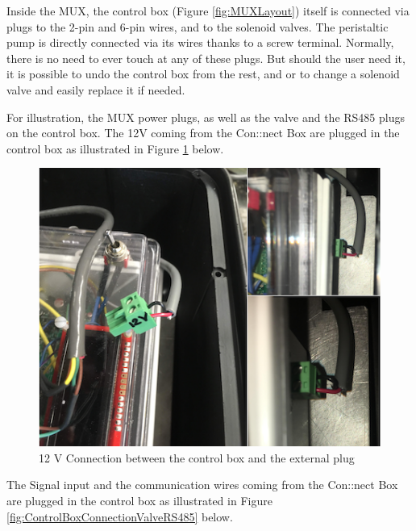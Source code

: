 \documentclass[]{book}
\begin{document}
Inside the MUX, the control box (Figure \ref{fig:MUXLayout}) itself is connected via plugs to the 2-pin and 6-pin wires, and to the solenoid valves. The peristaltic pump is directly connected via its wires thanks to a screw terminal. Normally, there is no need to ever touch at any of these plugs. But should the user need it, it is possible to undo the control box from the rest, and or to change a solenoid valve and easily replace it if needed.

For illustration, the MUX power plugs, as well as the valve and the RS485 plugs on the control box. The 12V coming from the Con::nect Box are plugged in the control box as illustrated in Figure \ref{fig:ControlBoxConnection12V} below.

\begin{figure}

{\centering \includegraphics[width=0.8\linewidth]{pictures/ControlBoxConnection12V} 

}

\caption{12 V Connection between the control box and the external plug}\label{fig:ControlBoxConnection12V}
\end{figure}

The Signal input and the communication wires coming from the Con::nect Box are plugged in the control box as illustrated in Figure \ref{fig:ControlBoxConnectionValveRS485} below.
\end{document}
